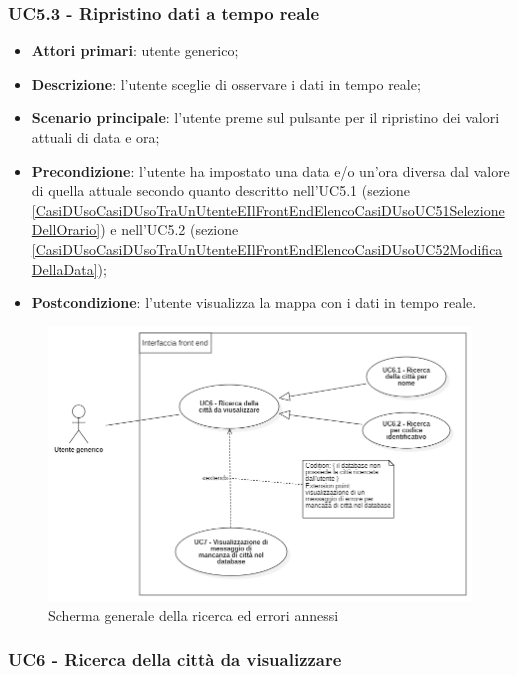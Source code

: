 \subsubsection{UC5.3 - Ripristino dati a tempo reale}\label{CasiDUsoCasiDUsoTraUnUtenteEIlFrontEndElencoCasiDUsoUC53RipristinoDatiATempoReale}
\begin{itemize}
	\item \textbf{Attori primari}: utente generico;
	\item \textbf{Descrizione}:  l’utente sceglie di osservare i dati in tempo reale;
	\item \textbf{Scenario principale}: l’utente preme sul pulsante per il ripristino dei valori attuali di data e ora;
	\item \textbf{Precondizione}: l’utente ha impostato una data e/o un’ora diversa dal valore di quella attuale secondo quanto descritto nell'UC5.1 (sezione \ref{CasiDUsoCasiDUsoTraUnUtenteEIlFrontEndElencoCasiDUsoUC51SelezioneDellOrario}) e nell'UC5.2 (sezione \ref{CasiDUsoCasiDUsoTraUnUtenteEIlFrontEndElencoCasiDUsoUC52ModificaDellaData});
	\item \textbf{Postcondizione}: l’utente visualizza la mappa con i dati in tempo reale.
\end{itemize}


\begin{center}
	\begin{figure}[H]
		\centering\includegraphics[scale=0.8]{../immagini/attori_casi/uc6.png}
		\caption{Scherma generale della ricerca ed errori annessi}
	\end{figure}
\end{center}


\subsubsection{UC6 - Ricerca della città da visualizzare}\label{CasiDUsoCasiDUsoTraUnUtenteEIlFrontEndElencoCasiDUsoUC6RicercaDellaCittàDaVisualizzare}

